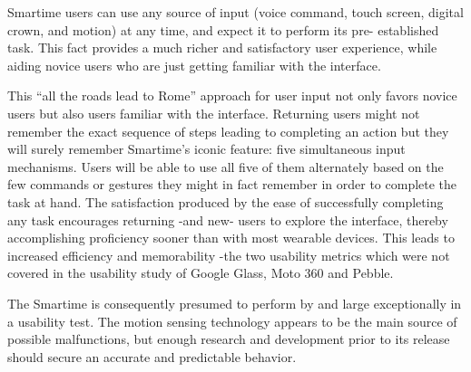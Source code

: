\documentclass{article}
\begin{document}
Smartime users can use any source of input (voice command, touch screen, digital crown, and motion) at any time, and expect it to perform its pre- established task. This fact provides a much richer and satisfactory user experience, while aiding novice users who are just getting familiar with the interface. 

This ``all the roads lead to Rome'' approach for user input not only favors novice users but also users familiar with the interface. Returning users might not remember the exact sequence of steps leading to completing an action but they will surely remember Smartime's iconic feature: five simultaneous input mechanisms. Users will be able to use all five of them alternately based on the few commands or gestures they might in fact remember in order to complete the task at hand.  The satisfaction produced by the ease of successfully completing any task encourages returning -and new- users to explore the interface, thereby accomplishing proficiency sooner than with most wearable devices.  This leads to increased efficiency and memorability -the two usability metrics which were not covered in the usability study of Google Glass, Moto 360 and Pebble. 

The Smartime is consequently presumed to perform by and large exceptionally in a usability test. The motion sensing technology appears to be the main source of possible malfunctions, but enough research and development prior to its release should secure an accurate and predictable behavior.





\end{document}
